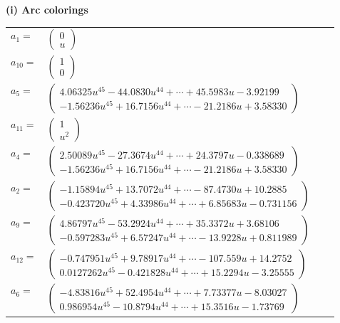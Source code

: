 \documentclass[1p]{elsarticle_modified}
\theoremstyle{definition}
\begin{document}
\flushleft \textbf{(i) Arc colorings}\\
\begin{tabular}{m{7pt} m{180pt} m{7pt} m{180pt} }
\flushright $a_{1}=$&$\begin{pmatrix}0\\u\end{pmatrix}$ \\
\flushright $a_{10}=$&$\begin{pmatrix}1\\0\end{pmatrix}$ \\
\flushright $a_{5}=$&$\begin{pmatrix}4.06325 u^{45}-44.0830 u^{44}+\cdots+45.5983 u-3.92199\\-1.56236 u^{45}+16.7156 u^{44}+\cdots-21.2186 u+3.58330\end{pmatrix}$ \\
\flushright $a_{11}=$&$\begin{pmatrix}1\\u^2\end{pmatrix}$ \\
\flushright $a_{4}=$&$\begin{pmatrix}2.50089 u^{45}-27.3674 u^{44}+\cdots+24.3797 u-0.338689\\-1.56236 u^{45}+16.7156 u^{44}+\cdots-21.2186 u+3.58330\end{pmatrix}$ \\
\flushright $a_{2}=$&$\begin{pmatrix}-1.15894 u^{45}+13.7072 u^{44}+\cdots-87.4730 u+10.2885\\-0.423720 u^{45}+4.33986 u^{44}+\cdots+6.85683 u-0.731156\end{pmatrix}$ \\
\flushright $a_{9}=$&$\begin{pmatrix}4.86797 u^{45}-53.2924 u^{44}+\cdots+35.3372 u+3.68106\\-0.597283 u^{45}+6.57247 u^{44}+\cdots-13.9228 u+0.811989\end{pmatrix}$ \\
\flushright $a_{12}=$&$\begin{pmatrix}-0.747951 u^{45}+9.78917 u^{44}+\cdots-107.559 u+14.2752\\0.0127262 u^{45}-0.421828 u^{44}+\cdots+15.2294 u-3.25555\end{pmatrix}$ \\
\flushright $a_{6}=$&$\begin{pmatrix}-4.83816 u^{45}+52.4954 u^{44}+\cdots+7.73377 u-8.03027\\0.986954 u^{45}-10.8794 u^{44}+\cdots+15.3516 u-1.73769\end{pmatrix}$ \\

\end{tabular}
\end{document}
